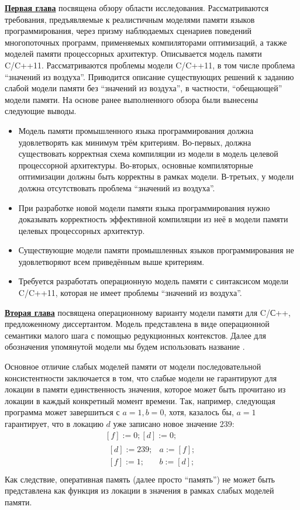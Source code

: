 \underline{\textbf{Первая глава}} посвящена обзору области исследования.
Рассматриваются требования, предъявляемые к реалистичным моделями памяти
языков программирования, через призму наблюдаемых сценариев поведений многопоточных программ,
применяемых компиляторами оптимизаций, а также моделей памяти процессорных архитектур.
Описывается модель памяти C/C++11. Рассматриваются проблемы модели C/C++11, в том числе
проблема ``значений из воздуха''. Приводится описание существующих решений к заданию
слабой модели памяти без ``значений из воздуха'', в частности, ``обещающей'' модели памяти.
На основе ранее выполненного обзора были вынесены следующие выводы.
\begin{itemize}
  \item Модель памяти промышленного языка программирования должна удовлетворять как минимум трём критериям.
    Во-первых, должна существовать корректная схема компиляции из модели в модель целевой процессорной
    архитектуры.
    Во-вторых, основные компиляторные оптимизации должны быть корректны в рамках модели.
    В-третьих, у модели должна отсутствовать проблема ``значений из воздуха''.
  \item При разработке новой модели памяти языка программирования нужно доказывать корректность эффективной компиляции
    из неё в модели памяти целевых процессорных архитектур.
  \item Существующие модели памяти промышленных языков программирования не удовлетворяют всем приведённым выше
    критериям.
  \item Требуется разработать операционную модель памяти с синтаксисом модели C/C++11, которая
    не имеет проблемы ``значений из воздуха''.
\end{itemize}

\underline{\textbf{Вторая глава}} посвящена операционному варианту модели памяти для C/С++,
предложенному диссертантом. Модель представлена в виде операционной семантики малого шага с помощью редукционных
контекстов. Далее для обозначения упомянутой модели мы будем использовать название \OpCpp.

Основное отличие слабых моделей памяти от модели последовательной консистентности заключается в том, что
слабые модели не гарантируют для локации в памяти единственность значения, которое может быть прочитано из локации
в каждый конкретный момент времени.
Так, например, следующая программа может завершиться с $a = 1, b = 0$, хотя, казалось бы, $a = 1$ гарантирует, что
в локацию $d$ уже записано новое значение $239$:
\[
\begin{array}{c}
[f] := 0; [d] := 0; \\
\begin{array}{l||l}
  {} [d] := 239; & a := [f]; \\
  {} [f] := 1;   & b := [d]; \\
\end{array}
\end{array}
\]
Как следствие, оперативная память (далее просто ``память'') не может быть представлена как функция из локации в значения в рамках слабых моделей памяти.


